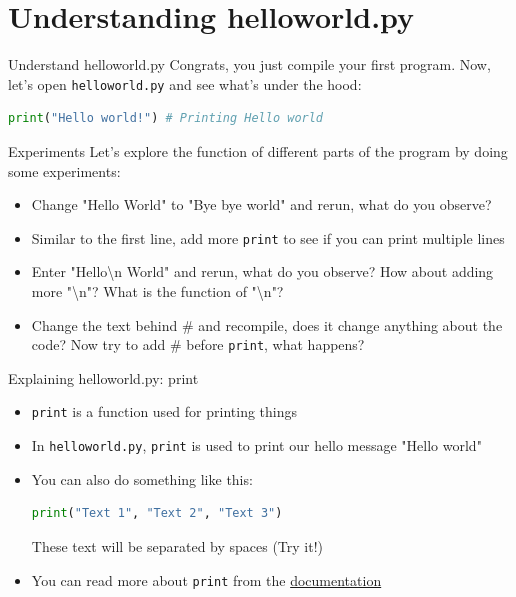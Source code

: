 \documentclass[10pt,xcolor={table,dvipsnames},t]{beamer}
\begin{document}
\section{Understanding helloworld.py}
\begin{frame}[fragile]{Understand helloworld.py}
  Congrats, you just compile your first program. Now, let's open \texttt{helloworld.py} and see what's under the hood:
  \begin{lstlisting}[language=python]
print("Hello world!") # Printing Hello world
\end{lstlisting}
\end{frame}

\begin{frame}[fragile]{Experiments}
  Let's explore the function of different parts of the program by doing some experiments:
  \begin{itemize}
    \item Change "Hello World" to "Bye bye world" and rerun, what do you observe?
    \item Similar to the first line, add more \texttt{print} to see if you can print multiple lines
    \item Enter "Hello\textbackslash n World" and rerun, what do you observe? How about adding more "\textbackslash n"? What is the function of "\textbackslash n"?
    \item Change the text behind \# and recompile, does it change anything about the code? Now try to add \# before \texttt{print}, what happens?
  \end{itemize}
\end{frame}

\begin{frame}[fragile]{Explaining helloworld.py: print}
  \begin{itemize}
    \item \texttt{print} is a function used for printing things
    \item In \texttt{helloworld.py}, \texttt{print} is used to print our hello message "Hello world"
    \item You can also do something like this:
\begin{lstlisting}[language=python]
  print("Text 1", "Text 2", "Text 3")
\end{lstlisting}
    These text will be separated by spaces (Try it!)
    \item You can read more about \texttt{print} from the \href{https://docs.python.org/3/library/functions.html#print}{documentation}
  \end{itemize}
\end{frame}
\end{document}
